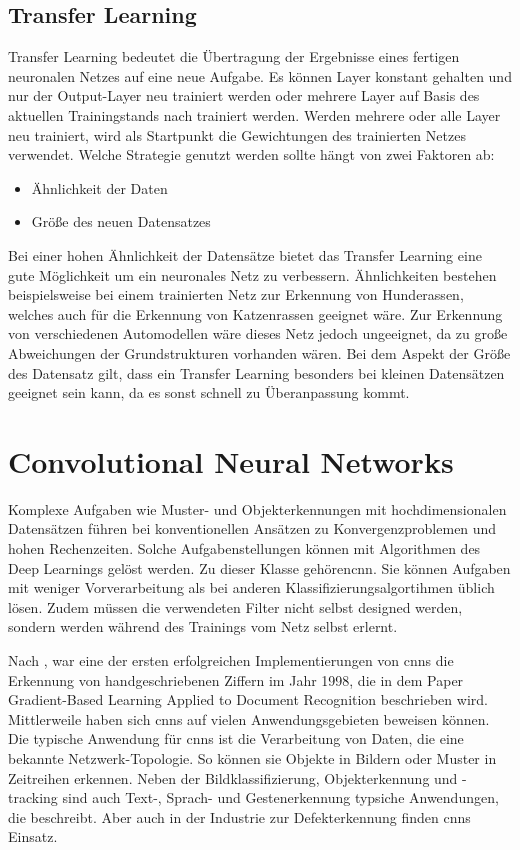 \subsection{Transfer Learning}
	Transfer Learning bedeutet die Übertragung der Ergebnisse eines fertigen neuronalen Netzes auf eine neue Aufgabe. 
	Es können Layer konstant gehalten und nur der Output-Layer
	neu trainiert werden oder mehrere Layer auf Basis des aktuellen Trainingstands nach
	trainiert werden. Werden mehrere oder alle Layer neu trainiert, wird als Startpunkt die
	Gewichtungen des trainierten Netzes verwendet. Welche Strategie genutzt werden sollte
	hängt von zwei Faktoren ab:
	
	\begin{itemize}
		\item Ähnlichkeit der Daten
		\item Größe des neuen Datensatzes
	\end{itemize}
		
	Bei einer hohen Ähnlichkeit der Datensätze bietet das Transfer Learning eine gute Möglichkeit
	um ein neuronales Netz zu verbessern. Ähnlichkeiten bestehen beispielsweise bei einem
	trainierten Netz zur Erkennung von Hunderassen, welches auch für die Erkennung von
	Katzenrassen geeignet wäre. Zur Erkennung von verschiedenen Automodellen wäre dieses Netz jedoch ungeeignet, 
	da zu große Abweichungen der Grundstrukturen vorhanden	wären.
	Bei dem Aspekt der Größe des Datensatz gilt, dass ein Transfer Learning besonders bei
	kleinen Datensätzen geeignet sein kann, da es sonst schnell zu Überanpassung kommt. \cite{Becker:2018}
	
	
\section{Convolutional Neural Networks}
Komplexe Aufgaben wie Muster- und Objekterkennungen mit hochdimensionalen Datensätzen führen bei konventionellen 
Ansätzen zu Konvergenzproblemen und hohen Rechenzeiten. Solche Aufgabenstellungen können mit Algorithmen des 
Deep Learnings gelöst werden. Zu dieser Klasse gehören\ac{cnn}. \cite{Ertel:2016}
Sie können Aufgaben mit weniger Vorverarbeitung als bei anderen Klassifizierungsalgortihmen üblich lösen. 
Zudem müssen die verwendeten Filter nicht selbst designed werden, sondern werden während des Trainings vom Netz 
selbst erlernt. \cite{Saha:2018}

Nach \cite{Sharma:2018}, war eine der ersten erfolgreichen Implementierungen von \ac{cnn}s die Erkennung von 
handgeschriebenen Ziffern im Jahr 1998, die in dem Paper \glqq Gradient-Based Learning Applied to Document Recognition\grqq \cite{LeCun:1998} 
beschrieben wird. Mittlerweile haben sich \ac{cnn}s auf vielen Anwendungsgebieten beweisen können. Die typische Anwendung für \ac{cnn}s ist die Verarbeitung von Daten, die eine bekannte Netzwerk-Topologie. So können sie Objekte in Bildern oder Muster in 
Zeitreihen erkennen. \cite{Namatevs.2017}
Neben der Bildklassifizierung, Objekterkennung und -tracking sind auch Text-, Sprach- und Gestenerkennung typsiche Anwendungen, 
die \cite{Gu:2018} beschreibt. Aber auch in der Industrie zur Defekterkennung finden \ac{cnn}s Einsatz. \cite{LopezdeLacalle:2020}

